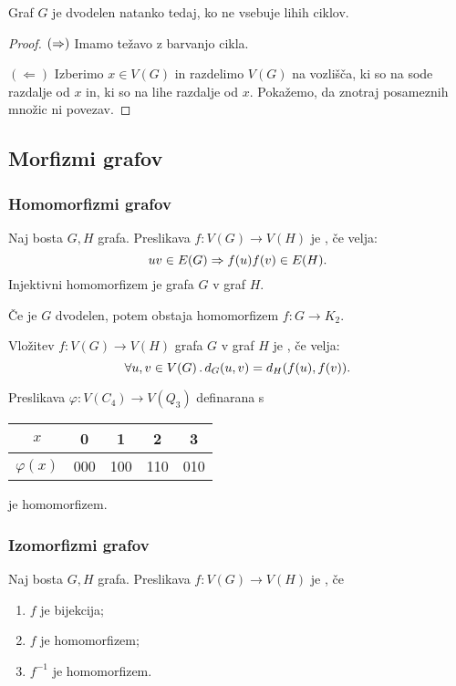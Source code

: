 \begin{izrek}
    Graf $G$ je dvodelen natanko tedaj, ko ne vsebuje lihih ciklov.
\end{izrek}

\begin{proof}
    $(\Rightarrow)$ Imamo težavo z barvanjo cikla.
    
    $(\Leftarrow)$ Izberimo $x \in V(G)$ in razdelimo $V(G)$ na vozlišča, ki so na sode razdalje od $x$ in, ki so na lihe razdalje od $x$. Pokažemo, da znotraj posameznih množic ni povezav.
\end{proof}

\subsection{Morfizmi grafov}
\subsubsection*{Homomorfizmi grafov}
\begin{definicija}
    Naj bosta $G, H$ grafa. Preslikava $f: V(G) \to V(H)$ je , če velja: $$uv \in E(G) \Rightarrow f(u)f(v) \in E(H).$$
    Injektivni homomorfizem je  grafa $G$ v graf $H$.
\end{definicija}

\begin{opomba}
    Če je $G$ dvodelen, potem obstaja homomorfizem $f: G \to K_2$.
\end{opomba}

\begin{definicija}
    Vložitev $f: V(G) \to V(H)$ grafa $G$ v graf $H$ je , če velja:
    $$\forall u, v \in V(G) \,.\,d_G(u,v)=d_H(f(u), f(v)).$$
\end{definicija}

\begin{primer}
    Preslikava $\varphi: V(C_4) \to V(Q_3)$ definarana s 
    \begin{center}
        \begin{tabular}{ c | c c c c }
         $x$ & 0 & 1 & 2 & 3 \\ \hline
         $\varphi(x)$ & 000 & 100 & 110 & 010  
        \end{tabular}
    \end{center}
    je homomorfizem.
\end{primer}

\subsubsection*{Izomorfizmi grafov}
\begin{definicija}
    Naj bosta $G, H$ grafa. Preslikava $f: V(G) \to V(H)$ je , če
    \begin{enumerate}
        \item $f$ je bijekcija;
        \item $f$ je homomorfizem;
        \item $f^{-1}$ je homomorfizem.
    \end{enumerate}
\end{definicija}

